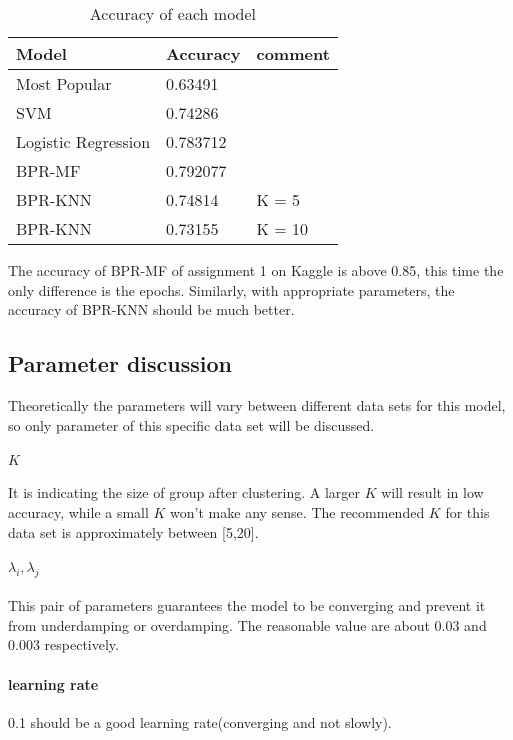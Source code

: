 \documentclass[paper=a4, fontsize=11pt, twocolumn]{scrartcl} %
\numberwithin{equation}{section} %
\numberwithin{figure}{section} %
\numberwithin{table}{section} %
\begin{document}
\begin{table}  
\caption{Accuracy of each model}  
\begin{tabular*}{7.2cm}{lll}  
\hline  
Model  & Accuracy & comment\\  
\hline 
Most Popular &  0.63491&\\   
SVM & 0.74286 &\\  
Logistic Regression& 0.783712 &\\  
BPR-MF & 0.792077 &\\ 
BPR-KNN & 0.74814 & K = 5\\  
BPR-KNN & 0.73155 & K = 10\\  
\hline  
\end{tabular*}  
\end{table}   

The accuracy of BPR-MF of assignment 1 on Kaggle is above 0.85, this time the only difference is the epochs. Similarly, with appropriate parameters, the accuracy of BPR-KNN  should be much better.

\subsection{Parameter discussion}

Theoretically the parameters will vary between different data sets for this model, so only parameter of this specific data set will be discussed.

\paragraph{$K$} It is indicating the size of group after clustering. A larger $K$ will result in low accuracy, while a small $K$ won't make any sense. The recommended $K$ for this data set is approximately between [5,20].

\paragraph{$\lambda_i,\lambda_j$} This pair of parameters guarantees the model to be converging and prevent it from underdamping or overdamping. The reasonable value are about 0.03 and 0.003 respectively.

\paragraph{learning rate} 0.1 should be a good learning rate(converging and not slowly).
\end{document}
